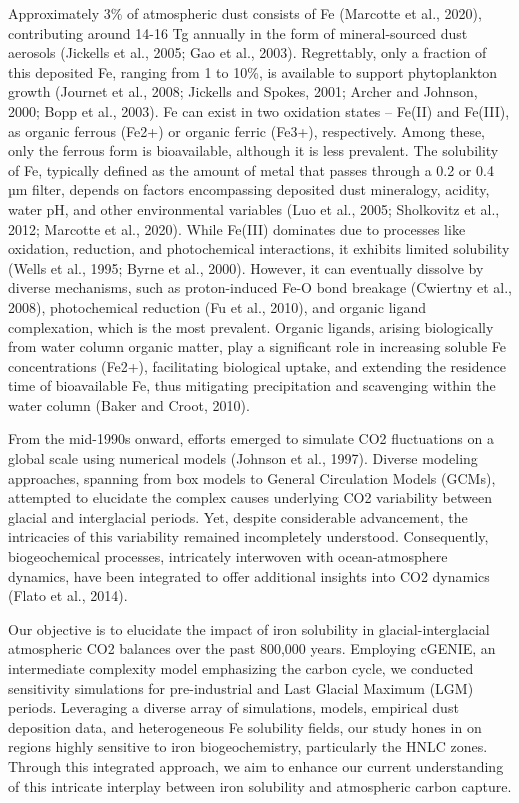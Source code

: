 Approximately 3\% of atmospheric dust consists of Fe (Marcotte et al., 2020), contributing around 14-16 Tg annually in the form of mineral-sourced dust aerosols (Jickells et al., 2005; Gao et al., 2003). Regrettably, only a fraction of this deposited Fe, ranging from 1 to 10\%, is available to support phytoplankton growth (Journet et al., 2008; Jickells and Spokes, 2001; Archer and Johnson, 2000; Bopp et al., 2003). Fe can exist in two oxidation states – Fe(II) and Fe(III), as organic ferrous (Fe2+) or organic ferric (Fe3+), respectively. Among these, only the ferrous form is bioavailable, although it is less prevalent. The solubility of Fe, typically defined as the amount of metal that passes through a 0.2 or 0.4 µm filter, depends on factors encompassing deposited dust mineralogy, acidity, water pH, and other environmental variables (Luo et al., 2005; Sholkovitz et al., 2012; Marcotte et al., 2020). While Fe(III) dominates due to processes like oxidation, reduction, and photochemical interactions, it exhibits limited solubility (Wells et al., 1995; Byrne et al., 2000). However, it can eventually dissolve by diverse mechanisms, such as proton-induced Fe-O bond breakage (Cwiertny et al., 2008), photochemical reduction (Fu et al., 2010), and organic ligand complexation, which is the most prevalent. Organic ligands, arising biologically from water column organic matter, play a significant role in increasing soluble Fe concentrations (Fe2+), facilitating biological uptake, and extending the residence time of bioavailable Fe, thus mitigating precipitation and scavenging within the water column (Baker and Croot, 2010).

From the mid-1990s onward, efforts emerged to simulate CO2 fluctuations on a global scale using numerical models (Johnson et al., 1997). Diverse modeling approaches, spanning from box models to General Circulation Models (GCMs), attempted to elucidate the complex causes underlying CO2 variability between glacial and interglacial periods. Yet, despite considerable advancement, the intricacies of this variability remained incompletely understood. Consequently, biogeochemical processes, intricately interwoven with ocean-atmosphere dynamics, have been integrated to offer additional insights into CO2 dynamics (Flato et al., 2014).

Our objective is to elucidate the impact of iron solubility in glacial-interglacial atmospheric CO2 balances over the past 800,000 years. Employing cGENIE, an intermediate complexity model emphasizing the carbon cycle, we conducted sensitivity simulations for pre-industrial and Last Glacial Maximum (LGM) periods. Leveraging a diverse array of simulations, models, empirical dust deposition data, and heterogeneous Fe solubility fields, our study hones in on regions highly sensitive to iron biogeochemistry, particularly the HNLC zones. Through this integrated approach, we aim to enhance our current understanding of this intricate interplay between iron solubility and atmospheric carbon capture.